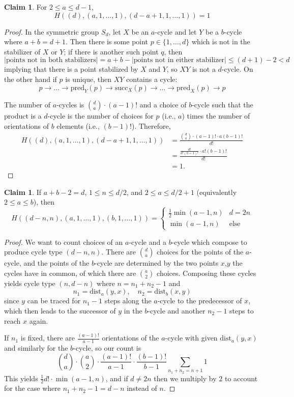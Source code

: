 \documentclass[thesis]{thesis-umich}           %
\theoremstyle{definition}
\newtheorem{claim}[thm]{Claim}
\begin{document}
\begin{claim}
  \label{claim:hurwitzdisjoint}
For $2\leq a\leq d-1$,
\[
H((d),(a,1,\dots,1),(d-a+1,1,\dots,1))=1
\]
\end{claim}
\begin{proof}
  In the symmetric group $S_d$, let $X$ be an $a$-cycle and let
  $Y$ be a $b$-cycle where $a+b=d+1$. Then there is some point
  $p\in\{1,\dots,d\}$ which is not in the stabilizer of $X$ or $Y$;
  if there is another such point $q$, then
  \[
  |\text{points not in both stabilizers}|=a+b-|\text{points not in either stabilizer}|\leq (d+1)-2<d
  \]
  implying that there is a point stabilized by $X$ and $Y$, so $XY$ is not a $d$-cycle. On the other hand
  if $p$ is unique, then
  $XY$ contains a cycle:
  \[
  p\to\dots\to \text{pred}_Y(p)\to\text{succ}_X(p)\to\dots\to\text{pred}_X(p)\to p
  \]
  
  The number of $a$-cycles is $\binom da\cdot (a-1)!$
  and a choice of $b$-cycle such that the product is a $d$-cycle is
  the number of choices for $p$ (i.e., $a$) times the number of orientations
  of $b$ elements (i.e., $(b-1)!$). Therefore,
  \begin{align*}
    H((d),(a,1,\dots,1),(d-a+1,1,\dots,1))&=\frac{\binom da\cdot (a-1)!\cdot a(b-1)!}{d!} \\
    &=\frac{\frac{d!}{a!(b-1)!}\cdot a!(b-1)!}{d!} \\
    &=1.
  \end{align*}
  \end{proof}

\begin{claim}
  \label{claim:Hurwitz2}
  If $a+b-2=d$, $1\leq n\leq d/2$, and $2\leq a\leq d/2+1$ (equivalently $2\leq a\leq b$), then
\[
H((d-n,n),(a,1,\dots,1),(b,1,\dots,1))=\begin{cases}
\frac 12\min(a-1,n)& d=2n \\
\min(a-1,n)&\text{else}
\end{cases}
\]
\end{claim}
\begin{proof}
  We want to count choices of an $a$-cycle and a $b$-cycle which compose to produce cycle type $(d-n,n)$.
  There are $\binom da$ choices for the points of the $a$-cycle, and the
  points of the $b$-cycle are determined by the two points $x$,$y$ the cycles have in common, of which there are $\binom a2$
  choices.
  Composing these cycles yields cycle type $(n,d-n)$ where $n=n_1+n_2-1$ and
  \[
  n_1=\text{dist}_a(y,x),\quad n_2=\text{dist}_b(x,y)
  \]
  since $y$ can be traced for $n_1-1$ steps along the $a$-cycle to the predecessor of $x$, which then leads to
  the successor of $y$ in the $b$-cycle and another $n_2-1$ steps to reach $x$ again.

  If $n_1$ is fixed, there are $\frac{(a-1)!}{a-1}$ orientations of the $a$-cycle with given $\text{dist}_a(y,x)$ and similarly for the $b$-cycle,
  so our count is
  \[
  \binom da\cdot \binom a2\cdot \frac{(a-1)!}{a-1}\cdot\frac{(b-1)!}{b-1}\sum_{n_1+n_2=n+1}1
  \]
  This yields $\frac 12d!\cdot\min(a-1,n)$, and if $d\neq 2n$ then we multiply by $2$ to account for the case where $n_1+n_2-1=d-n$ instead of $n$.
  \end{proof}
\end{document}
